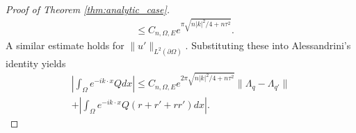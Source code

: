 \documentclass[a4paper, 11pt, twoside, notitlepage]{amsart}
\theoremstyle{definition}
\theoremstyle{remark}
\newcommand{\f}[1]{\footnote{\textcolor{blue}{#1}}}
\newcommand {\p} {\partial}
\begin{document}
\begin{proof}[Proof of Theorem \ref{thm:analytic_case}]
\begin{align*}
    &\leq C_{n,\Omega, E} e^{\pi\sqrt{n|k|^2/4+n\tau^2}}.
\end{align*}
A similar estimate holds for $\|u'\|_{L^2(\p\Omega)}$. Substituting these into Alessandrini's identity yields 
\begin{multline}\label{real_analytic_stability_est1}
\left|\int_\Omega e^{-ik\cdot x}Qdx\right| \leq C_{n,\Omega, E} e^{2\pi\sqrt{n|k|^2/4+n\tau^2}}\|\Lambda_q-\Lambda_{q'}\| \\
 +\left|\int_\Omega e^{-ik\cdot x}Q(r+r'+rr')dx\right|.
\end{multline}




\end{proof}
\end{document}
